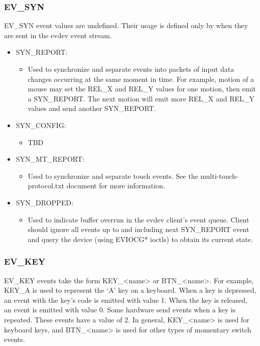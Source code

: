 \documentclass[a4paper,8pt,english]{sphinxmanual}
\begin{document}
\subsubsection{EV\_SYN}
\label{input/event-codes:ev-syn}
EV\_SYN event values are undefined. Their usage is defined only by when they are
sent in the evdev event stream.
\begin{itemize}
\item {} 
SYN\_REPORT:
\begin{itemize}
\item {} 
Used to synchronize and separate events into packets of input data changes
occurring at the same moment in time. For example, motion of a mouse may set
the REL\_X and REL\_Y values for one motion, then emit a SYN\_REPORT. The next
motion will emit more REL\_X and REL\_Y values and send another SYN\_REPORT.

\end{itemize}

\item {} 
SYN\_CONFIG:
\begin{itemize}
\item {} 
TBD

\end{itemize}

\item {} 
SYN\_MT\_REPORT:
\begin{itemize}
\item {} 
Used to synchronize and separate touch events. See the
multi-touch-protocol.txt document for more information.

\end{itemize}

\item {} 
SYN\_DROPPED:
\begin{itemize}
\item {} 
Used to indicate buffer overrun in the evdev client's event queue.
Client should ignore all events up to and including next SYN\_REPORT
event and query the device (using EVIOCG* ioctls) to obtain its
current state.

\end{itemize}

\end{itemize}


\subsubsection{EV\_KEY}
\label{input/event-codes:ev-key}
EV\_KEY events take the form KEY\_\textless{}name\textgreater{} or BTN\_\textless{}name\textgreater{}. For example, KEY\_A is used
to represent the `A' key on a keyboard. When a key is depressed, an event with
the key's code is emitted with value 1. When the key is released, an event is
emitted with value 0. Some hardware send events when a key is repeated. These
events have a value of 2. In general, KEY\_\textless{}name\textgreater{} is used for keyboard keys, and
BTN\_\textless{}name\textgreater{} is used for other types of momentary switch events.
\end{document}
